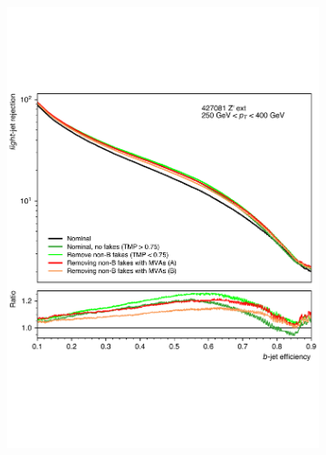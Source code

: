 \begin{figure}[!htbp]
  \centering
  \begin{subfigure}[b]{0.48\textwidth}
      \centering
      \includegraphics[width=\textwidth]{chapters/track_classifier/figs/zprime_jf_lowpt.pdf}
  \end{subfigure}
  \quad
  \begin{subfigure}[b]{0.48\textwidth}
      \centering

\end{subfigure}
\end{figure}
